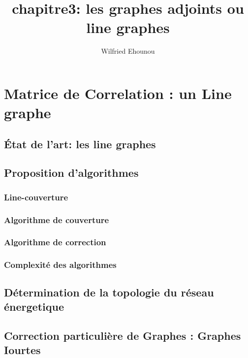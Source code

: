 \documentclass[onecolumn, 12pt]{book}
\title{chapitre3: les graphes adjoints ou line graphes}
\author{Wilfried Ehounou}
\date{\oldstylenums{\today}}
\begin{document}
\maketitle
\tableofcontents

\chapter{Matrice de Correlation : un Line graphe}
	\section{ \'Etat de l'art: les line graphes}
		
	\section{Proposition d'algorithmes}
		\subsection{Line-couverture}
			
		\subsection{Algorithme de couverture}
		\subsection{Algorithme de correction}
			
		\subsection{Complexit\'e des algorithmes}
			
	
	\section{D\'etermination de la topologie du r\'eseau \'energetique}
		
	\section{Correction particuli\`ere de Graphes : Graphes Iourtes }
	
\end{document}
